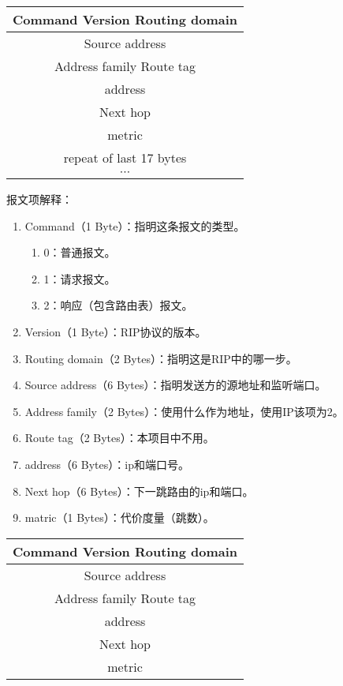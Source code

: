 \documentclass[15pt]{ctexart}
\begin{document}

\tableofcontents
\newpage

\begin{table}[H]
	\centering
	\begin{tabular}{|c|}
		\hline
		Command \; \vline \; Version \; \vline \; Routing domain \; \\
		\hline
		Source address \\
		\hline
		Address family \; \vline \; Route tag \; \\
		\hline
		address \\
		\hline
		Next hop \\
		\hline
		metric \\
		\hline
		repeat of last 17 bytes \\
		\hline
		$\cdots$ \\
		\hline 
	\end{tabular}	
\end{table}
报文项解释：
\begin{enumerate}
	\item Command（1 Byte）：指明这条报文的类型。
	\begin{enumerate}[]
		\item 0：普通报文。
		\item 1：请求报文。
		\item 2：响应（包含路由表）报文。
	\end{enumerate}
	\item Version（1 Byte）：RIP协议的版本。
	\item Routing domain（2 Bytes）：指明这是RIP中的哪一步。
	\item Source address（6 Bytes）：指明发送方的源地址和监听端口。
	\item Address family（2 Bytes）：使用什么作为地址，使用IP该项为2。
	\item Route tag（2 Bytes）：本项目中不用。
	\item address（6 Bytes）：ip和端口号。
	\item Next hop（6 Bytes）：下一跳路由的ip和端口。
	\item matric（1 Bytes）：代价度量（跳数）。
\end{enumerate}
\begin{table}[H]
	\centering
	\begin{tabular}{|c|}
		\hline
		Command \; \vline \; Version \; \vline \; Routing domain \; \\
		\hline
		Source address \\
		\hline
		Address family \; \vline \; Route tag \; \\
		\hline
		address \\
		\hline
		Next hop \\
		\hline
		metric \\
		\hline
	\end{tabular}
\end{table}
\end{document}
